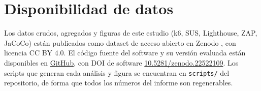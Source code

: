 \documentclass[11pt,a4paper]{report}
\begin{document}
\tableofcontents
\clearpage


\clearpage

\clearpage

\clearpage

\clearpage



\clearpage
\section*{Disponibilidad de datos}

Los datos crudos, agregados y figuras de este estudio (k6, SUS, Lighthouse, ZAP,
JaCoCo) están publicados como dataset de acceso abierto en Zenodo
\cite{dataset_sgroas}, con licencia CC BY 4.0. El código fuente del software y
su versión evaluada están disponibles en
\href{https://github.com/gleiston-guerrero/SGROAS-ProyectoAppWeb}{GitHub}, con DOI de
software \href{https://doi.org/10.5281/zenodo.22522109}{10.5281/zenodo.22522109}.
Los scripts que generan cada análisis y figura se encuentran en
\texttt{scripts/} del repositorio, de forma que todos los números del informe
son regenerables.

\clearpage
\printbibliography[title={Referencias}]

\nocite{*}
\end{document}
